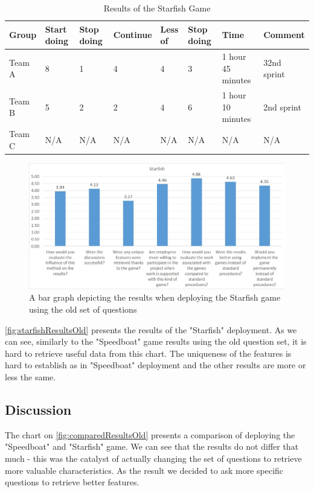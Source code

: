 \begin{table}[!htbp]
	\caption{Results of the Starfish Game}
	\label{tab:groups-starTeamResults}
	\begin{tabularx}{\textwidth}{|X|X|X|X|X|X|X|X|}
	\hline
		Group & Start doing & Stop doing & Continue & Less of &  Stop doing & Time & Comment\\ \hline
		Team A & 8 & 1 & 4 & 4 & 3 & 1 hour 45 minutes & 32nd sprint \\ \hline
		Team B & 5 & 2 & 2 & 4 & 6 & 1 hour 10 minutes & 2nd sprint \\ \hline
        Team C & N/A & N/A & N/A & N/A & N/A & N/A & N/A\\ \hline
	\end{tabularx}
\end{table}

\begin{figure}[!htbp]
\caption{A bar graph depicting the results when deploying the Starfish game using the old set of questions}
\label{fig:starfishResultsOld}
\centering
\includegraphics[width=1\textwidth]{charts/starfishOldSet}
\end{figure}

\autoref{fig:starfishResultsOld} presents the results of the "Starfish" deployment. As we can see, similarly to the "Speedboat" game results using the old question set, it is hard to retrieve useful data from this chart. The uniqueness of the features is hard to establish as in "Speedboat" deployment and the other results are more or less the same. 

\subsection{Discussion}
The chart on \autoref{fig:comparedResultsOld} presents a comparison of deploying the "Speedboat" and "Starfish" game. We can see that the results do not differ that much - this was the catalyst of actually changing the set of questions to retrieve more valuable characteristics. As the result we decided to ask more specific questions to retrieve better features. 


